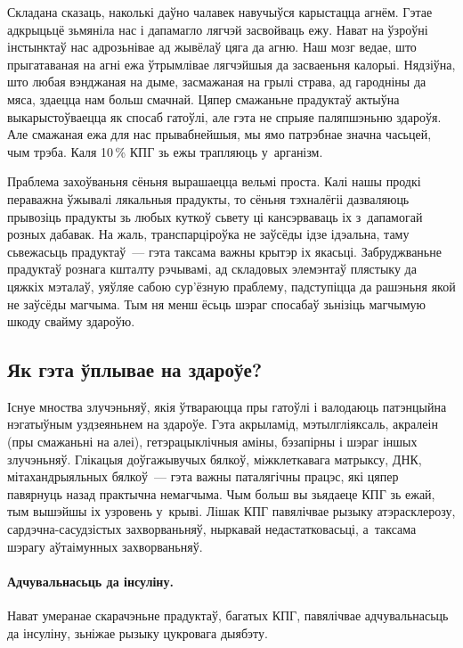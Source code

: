 Складана сказаць, наколькі даўно чалавек навучыўся карыстацца агнём. Гэтае адкрыцьцё зьмяніла нас і дапамагло лягчэй засвойваць ежу. Нават на ўзроўні інстынктаў нас адрозьнівае ад жывёлаў цяга да агню. Наш мозг ведае, што прыгатаваная на агні ежа ўтрымлівае лягчэйшыя да засваеньня калорыі. Нядзіўна, што любая вэнджаная на дыме, засмажаная на грылі страва, ад гародніны да мяса, здаецца нам больш смачнай. Цяпер смажаньне прадуктаў актыўна выкарыстоўваецца як спосаб гатоўлі, але гэта не спрыяе паляпшэньню здароўя. Але смажаная ежа для нас прывабнейшыя, мы ямо патрэбнае значна часьцей, чым трэба. Каля 10\,\% КПГ зь ежы трапляюць у~арганізм.


Праблема захоўваньня сёньня вырашаецца вельмі проста. Калі нашы продкі пераважна ўжывалі лякальныя прадукты, то сёньня тэхналёгіі дазваляюць прывозіць прадукты зь любых куткоў сьвету ці кансэрваваць іх з~дапамогай розных дабавак. На жаль, транспарціроўка не заўсёды ідзе ідэальна, таму сьвежасьць прадуктаў~--- гэта таксама важны крытэр іх якасьці. Забруджваньне прадуктаў рознага кшталту рэчывамі, ад складовых элемэнтаў плястыку да цяжкіх мэталаў, уяўляе сабою сур'ёзную праблему, падступіцца да рашэньня якой не заўсёды магчыма. Тым ня менш ёсьць шэраг спосабаў зьнізіць магчымую шкоду свайму здароўю.

\subsection{Як гэта ўплывае на здароўе?}

Існуе мноства злучэньняў, якія ўтвараюцца пры гатоўлі і валодаюць патэнцыйна нэгатыўным уздзеяньнем на здароўе. Гэта акрыламід, мэтылгліяксаль, акралеін (пры смажаньні на алеі), гетэрацыклічныя аміны, бэзапірны і шэраг іншых злучэньняў. Глікацыя доўгажывучых бялкоў, міжклеткавага матрыксу, ДНК, мітахандрыяльных бялкоў~--- гэта важны паталягічны працэс, які цяпер павярнуць назад практычна немагчыма. Чым больш вы зьядаеце КПГ зь ежай, тым вышэйшы іх узровень у~крыві. Лішак КПГ павялічвае рызыку атэрасклерозу, сардэчна-сасудзістых захворваньняў, ныркавай недастатковасьці, а~таксама шэрагу аўтаімунных захворваньняў.

\paragraph{Адчувальнасьць да інсуліну.}
Нават умеранае скарачэньне прадуктаў, багатых КПГ, павялічвае адчувальнасьць да інсуліну, зьніжае рызыку цукровага дыябэту.

